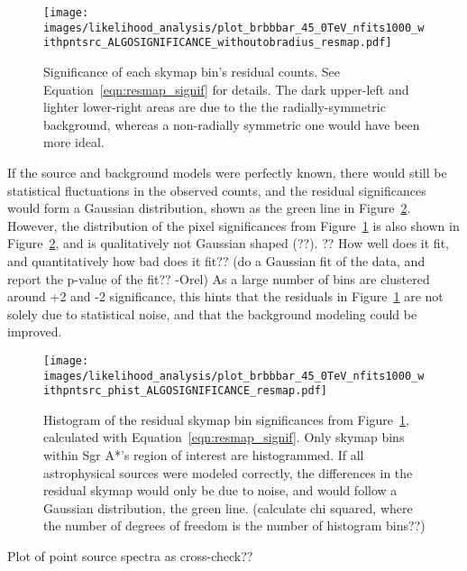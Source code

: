   \begin{figure}[ht]
    \centering
    \texttt{[image: images/likelihood\_analysis/plot\_brbbbar\_45\_0TeV\_nfits1000\_withpntsrc\_ALGOSIGNIFICANCE\_withoutobradius\_resmap.pdf]}
    \caption[Galactic Center Residual Map]
    {
      Significance of each skymap bin's residual counts.
      See Equation~\ref{eqn:resmap_signif} for details.
      The dark upper-left and lighter lower-right areas are due to the the radially-symmetric background, whereas a non-radially symmetric one would have been more ideal.
    }
    \label{fig:gc_resmap}
  \end{figure}

  If the source and background models were perfectly known, there would still be statistical fluctuations in the observed counts, and the residual significances would form a Gaussian distribution, shown as the green line in Figure~\ref{fig:gc_resmap_sighist}.
  However, the distribution of the pixel significances from Figure~\ref{fig:gc_resmap} is also shown in Figure~\ref{fig:gc_resmap_sighist}, and is qualitatively not Gaussian shaped {\color{red}(??)}.
  {\color{red}?? How well does it fit, and quantitatively how bad does it fit??}
  {\color{red}(do a Gaussian fit of the data, and report the p-value of the fit?? -Orel)}
  As a large number of bins are clustered around +2 and -2 significance, this hints that the residuals in Figure~\ref{fig:gc_resmap} are not solely due to statistical noise, and that the background modeling could be improved.
  
  \begin{figure}[ht]
    \centering
    \texttt{[image: images/likelihood\_analysis/plot\_brbbbar\_45\_0TeV\_nfits1000\_withpntsrc\_phist\_ALGOSIGNIFICANCE\_resmap.pdf]}
    \caption[Galactic Center Residual Histogram]
    {
      Histogram of the residual skymap bin significances from Figure~\ref{fig:gc_resmap}, calculated with Equation~\ref{eqn:resmap_signif}.
      Only skymap bins within Sgr A*'s region of interest are histogrammed.
      If all astrophysical sources were modeled correctly, the differences in the residual skymap would only be due to noise, and would follow a Gaussian distribution, the green line.
      {\color{red}(calculate chi squared, where the number of degrees of freedom is the number of histogram bins??)}
    }
    \label{fig:gc_resmap_sighist}
  \end{figure}

  {\color{red}Plot of point source spectra as cross-check??}
  
